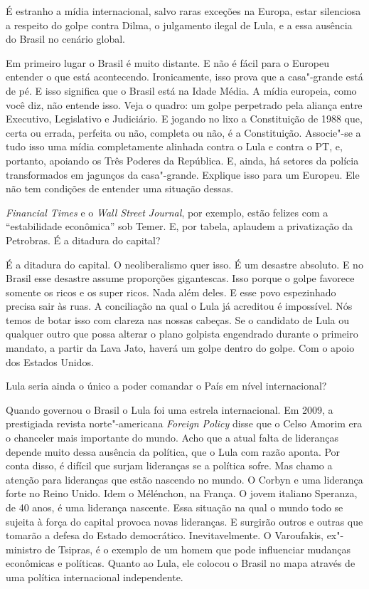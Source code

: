 \falaG É estranho a mídia internacional, salvo raras exceções na Europa,
estar silenciosa a respeito do golpe contra Dilma, o julgamento ilegal
de Lula, e a essa ausência do Brasil no cenário global.

\falaM Em primeiro lugar o Brasil é muito distante. E não é fácil para o
Europeu entender o que está acontecendo. Ironicamente, isso prova que a
casa"-grande está de pé. E isso significa que o Brasil está na Idade
Média. A mídia europeia, como você diz, não entende isso. Veja o quadro:
um golpe perpetrado pela aliança entre Executivo, Legislativo e
Judiciário. E jogando no lixo a Constituição de 1988 que, certa ou
errada, perfeita ou não, completa ou não, é a Constituição. Associe"-se a
tudo isso uma mídia completamente alinhada contra o Lula e contra o PT,
e, portanto, apoiando os Três Poderes da República. E, ainda, há setores
da polícia transformados em jagunços da casa"-grande. Explique isso para
um Europeu. Ele não tem condições de entender uma situação dessas.

\falaG \emph{Financial Times} e o \emph{Wall Street Journal}, por exemplo,
estão felizes com a ``estabilidade econômica'' sob Temer. E, por tabela,
aplaudem a privatização da Petrobras. É a ditadura do capital?

\falaM É a ditadura do capital. O neoliberalismo quer isso. É um desastre
absoluto. E no Brasil esse desastre assume proporções gigantescas. Isso
porque o golpe favorece somente os ricos e os super ricos. Nada além
deles. E esse povo espezinhado precisa sair às ruas. A conciliação na
qual o Lula já acreditou é impossível. Nós temos de botar isso com
clareza nas nossas cabeças. Se o candidato de Lula ou qualquer outro que
possa alterar o plano golpista engendrado durante o primeiro mandato, a
partir da Lava Jato, haverá um golpe dentro do golpe. Com o apoio dos
Estados Unidos.

\falaG Lula seria ainda o único a poder comandar o País em nível
internacional?

\falaM Quando governou o Brasil o Lula foi uma estrela internacional. Em
2009, a prestigiada revista norte"-americana \emph{Foreign Policy} disse
que o Celso Amorim era o chanceler mais importante do mundo. Acho que a
atual falta de lideranças depende muito dessa ausência da política, que
o Lula com razão aponta. Por conta disso, é difícil que surjam
lideranças se a política sofre. Mas chamo a atenção para lideranças que
estão nascendo no mundo. O Corbyn e uma liderança forte no Reino Unido.
Idem o Mélénchon, na França. O jovem italiano Speranza, de 40 anos, é
uma liderança nascente. Essa situação na qual o mundo todo se sujeita à
força do capital provoca novas lideranças. E surgirão outros e outras
que tomarão a defesa do Estado democrático. Inevitavelmente. O
Varoufakis, ex"-ministro de Tsipras, é o exemplo de um homem que pode
influenciar mudanças econômicas e políticas. Quanto ao Lula, ele colocou
o Brasil no mapa através de uma política internacional independente.

